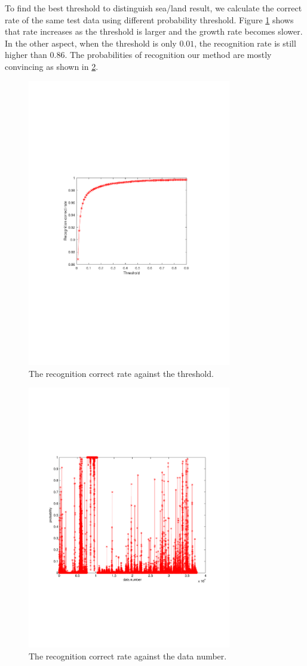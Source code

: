 To find the best threshold to distinguish sea/land result, we calculate the correct rate of the same test data using different probability threshold. Figure \ref{fig:threshold} shows that rate increases as the threshold is larger and the growth rate becomes slower. In the other aspect, when the threshold is only $0.01$, the recognition rate is still higher than $0.86$. The probabilities of recognition our method are mostly convincing as shown in \ref{fig:prob}.
\begin{figure}[!t]
	\centering
	\includegraphics[width=3.5in]{figures/threashold}
	\caption{The recognition correct rate against the threshold.}
	\label{fig:threshold}
\end{figure}
\begin{figure}[!t]
	\centering
	\includegraphics[width=3.5in]{figures/prob}
	\caption{The recognition correct rate against the data number.}
	\label{fig:prob}
\end{figure}
